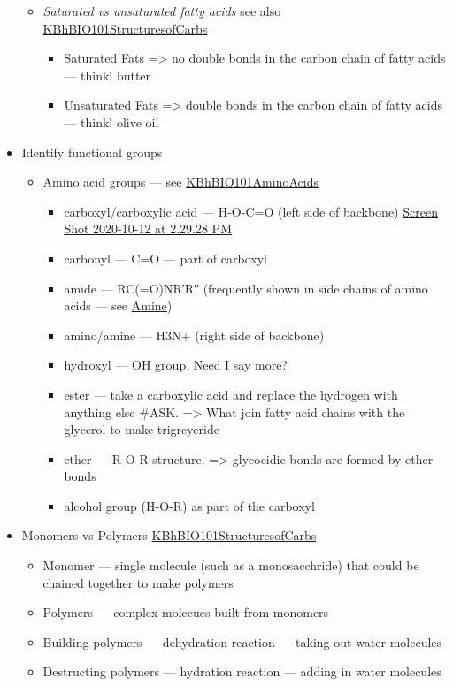 \documentclass[letterpaper]{article}
\begin{document}
\begin{itemize}
\begin{itemize}
\item \emph{Saturated vs unsaturated fatty acids} see also
\href{KBhBIO101StructuresofCarbs.org}{KBhBIO101StructuresofCarbs}

\begin{itemize}
\item Saturated Fats => no double bonds in the carbon chain of fatty
acids --- think! butter
\item Unsaturated Fats => double bonds in the carbon chain of fatty
acids --- think! olive oil
\end{itemize}
\end{itemize}

\item Identify functional groups

\begin{itemize}
\item Amino acid groups --- see
\href{KBhBIO101AminoAcids.org}{KBhBIO101AminoAcids}

\begin{itemize}
\item carboxyl/carboxylic acid --- H-O-C=O (left side of backbone)
\href{Screen Shot 2020-10-12 at 2.29.28 PM.org}{Screen Shot
2020-10-12 at 2.29.28 PM}
\item carbonyl --- C=O --- part of carboxyl
\item amide --- RC(=O)NR′R″ (frequently shown in side chains of amino
acids --- see
\href{https://en.wikipedia.org/wiki/Amide\#/media/File:Amide-general.png}{Amine})
\item amino/amine --- H3N+ (right side of backbone)
\item hydroxyl --- OH group. Need I say more?
\item ester --- take a carboxylic acid and replace the hydrogen with
anything else \#ASK. => What join fatty acid chains with the
glycerol to make trigrcyeride
\item ether --- R-O-R structure. => glycocidic bonds are formed by ether
bonds
\item alcohol group (H-O-R) as part of the carboxyl
\end{itemize}
\end{itemize}

\item Monomers vs Polymers
\href{KBhBIO101StructuresofCarbs.org}{KBhBIO101StructuresofCarbs}

\begin{itemize}
\item Monomer --- single molecule (such as a monosacchride) that could be
chained together to make polymers
\item Polymers --- complex molecues built from monomers
\item Building polymers --- dehydration reaction --- taking out water
molecules
\item Destructing polymers --- hydration reaction --- adding in water
molecules
\end{itemize}
\end{itemize}
\end{document}
